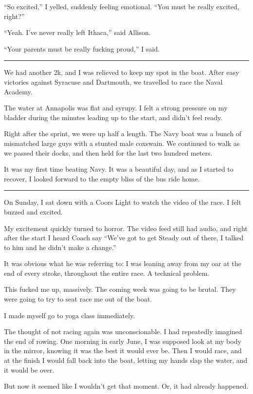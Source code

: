 ``So excited,'' I yelled, suddenly feeling emotional.  ``You must be
really excited, right?''

``Yeah.  I've never really left Ithaca,'' said Allison.

``Your parents must be really fucking proud,'' I said.

\plainfancybreak{12pt}{2}{}

We had another 2k, and I was relieved to keep my spot in the boat.  After easy
victories against Syracuse and Dartmouth, we travelled to race the Naval
Academy.

The water at Annapolis was flat and syrupy.  I felt a strong pressure on my
bladder during the minutes leading up to the start, and didn't feel ready.

Right after the sprint, we were up half a length.  The Navy boat was a bunch of
mismatched large guys with a stunted male coxswain.  We continued to walk as we
passed their docks, and then held for the last two hundred meters.

It was my first time beating Navy.  It was a beautiful day, and as I started to
recover, I looked forward to the empty bliss of the bus ride home.

\plainfancybreak{12pt}{2}{}

On Sunday, I sat down with a Coors Light to watch the video of the race.  I felt
buzzed and excited.

My excitement quickly turned to horror.  The video feed still had audio, and
right after the start I heard Coach say ``We've got to get Steady out of there,
I talked to him and he didn't make a change.''

It was obvious what he was referring to: I was leaning away from my oar at the
end of every stroke, throughout the entire race.  A technical problem.

This fucked me up, massively.  The coming week was going to be brutal.  They
were going to try to seat race me out of the boat.

I made myself go to yoga class immediately.

The thought of not racing again was unconscionable.  I had repeatedly imagined
the end of rowing.  One morning in early June, I was supposed look at my body in
the mirror, knowing it was the best it would ever be.  Then I would race, and at
the finish I would fall back into the boat, letting my hands slap the water, and
it would be over.

But now it seemed like I wouldn't get that moment.  Or, it had already happened.

